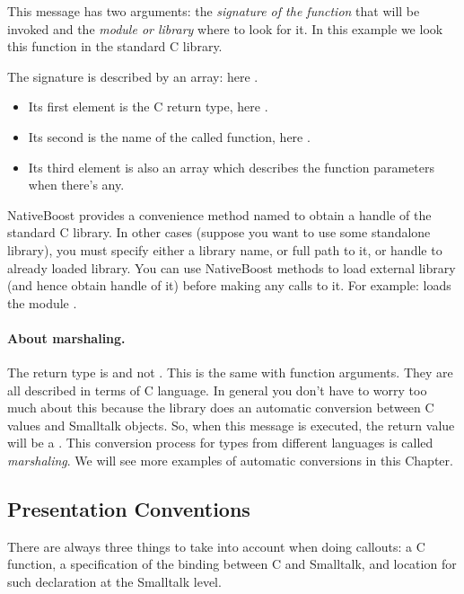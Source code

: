 \documentclass[a4paper,10pt,twoside]{book}
\begin{document}
This message has two arguments: the \emph{signature of the function} that will be invoked and the \emph{module or library} where to look for it.  In this example we look this function in the standard C library. 


The signature is described by an array: here .
\begin{itemize} 
\item Its first element is the C return type, here .
\item Its second is the name of the called function, here .
\item Its third element is also an array which describes the function parameters when there's any. 
\end{itemize}

NativeBoost provides a convenience method named 
to obtain a handle of the standard C library. In other cases (suppose you want to use some standalone library), you must specify either a library name, or full path to it, or handle to already loaded library. You can use
NativeBoost methods  to load external library (and hence obtain handle of it) before making any calls to it. For example:  loads the module .


\paragraph{About marshaling.} The return type is  and not . This is the same with function arguments. They are all described in terms of C language. In general you don't have to worry too much about this because the \Spock library does an automatic conversion between C values and Smalltalk objects. So, when this message is executed, the return value will be a . 
This conversion process for types from different languages is called \emph{marshaling}.
We will see more examples of automatic conversions in this Chapter. 

\subsection{Presentation Conventions}

There are always three things to take into account when doing callouts:  a C function, a specification of the binding between C and Smalltalk, and location for such declaration at the Smalltalk level. 
\end{document}
